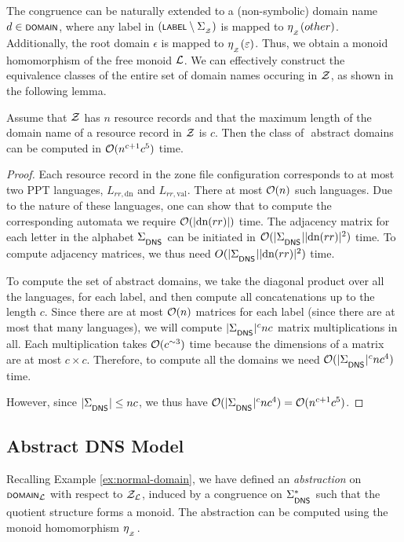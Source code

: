 The congruence can be naturally extended to a (non-symbolic) domain name $d \in \scrsf{domain}$, where any label in $(\scrsf{label}\setminus\zoneAlph)$ is mapped to $\synhomZ(\zoneAlphCompl)$. Additionally, the root domain $\epsilon$ is mapped to $\synhomZ (\varepsilon)$. Thus, we obtain a monoid homomorphism of the free monoid $\cal L$. We can effectively construct the equivalence classes of the entire set of domain names occuring in $\cal Z$, as shown in the following lemma.

\begin{lemma}
	Assume that $\cal Z$ has $n$ resource records and that the maximum length of the domain name of a resource record in $\cal Z$ is $c$. Then the class of $ $ abstract domains can be computed in $\cal O (n^{c+1}c^5)$ time.
\end{lemma}
\begin{proof}
    Each resource record in the zone file configuration corresponds to at most two PPT languages, $L_{rr,\text{dn}}$ and $L_{rr,\text{val}}$. There at most $\cal O (n)$ such languages. Due to the nature of these languages, one can show that to compute the corresponding automata we require $\cal O (|\text{dn}(rr)|)$ time. The adjacency matrix for each letter in the alphabet $\dnsAlph$ can be initiated in $\cal O(|\dnsAlph||\text{dn}(rr)|^2)$ time. To compute adjacency matrices, we thus need $O(|\dnsAlph||\text{dn}(rr)|^2)$ time.

    To compute the set of abstract domains, we take the diagonal product over all the languages, for each label, and then compute all concatenations up to the length $c$. Since there are at most $\cal O (n)$ matrices for each label (since there are at most that many languages), we will compute $|\dnsAlph|^cnc$ matrix multiplications in all. Each multiplication takes $\cal O(c^{\sim 3})$ time because the dimensions of a matrix are at most $c\times c$. Therefore, to compute all the domains we need $\cal O(|\dnsAlph|^cnc^4)$ time.

    However, since $|\dnsAlph| \leq nc$, we thus have $\cal O(|\dnsAlph|^cnc^4) = \cal O(n^{c+1}c^5)$.
\end{proof}

\subsection{Abstract DNS Model}\label{subsec:abstract-model}

Recalling Example \ref{ex:normal-domain}, we have defined an \emph{abstraction} on $\scrsf{domain}_{\cal L}$ with respect to $\cal Z_{\cal L}$, induced by a congruence on $\dnsAlph^*$ such that the quotient structure forms a monoid. The abstraction can be computed using the monoid homomorphism $\synhomZ$.


